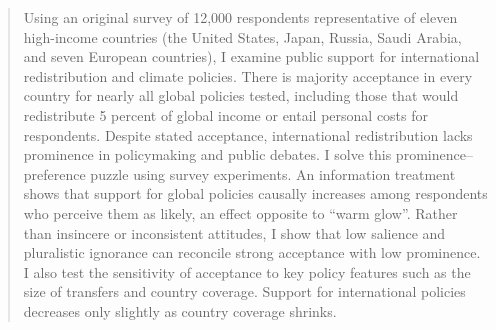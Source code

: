 \documentclass[12pt,english]{article}
\begin{document}
\begin{abstract}

Using an original survey of 12,000 respondents representative of eleven high-income countries (the United States, Japan, Russia, Saudi Arabia, and seven European countries), I examine public support for international redistribution and climate policies. 
There is majority acceptance in every country for nearly all global policies tested, including those that would redistribute 5 percent of global income or entail personal costs for respondents. 
Despite stated acceptance, international redistribution lacks prominence in policymaking and public debates. %
I solve this prominence--preference puzzle using survey experiments. An information treatment shows that support for global policies causally increases among respondents who perceive them as likely, an effect opposite to ``warm glow''. Rather than insincere or inconsistent attitudes, I show that low salience and pluralistic ignorance can reconcile strong acceptance with low prominence.
I also test the sensitivity of acceptance to key policy features such as the size of transfers and country coverage. %
Support for international policies decreases only slightly as country coverage shrinks. 


\end{abstract}
\end{document}

